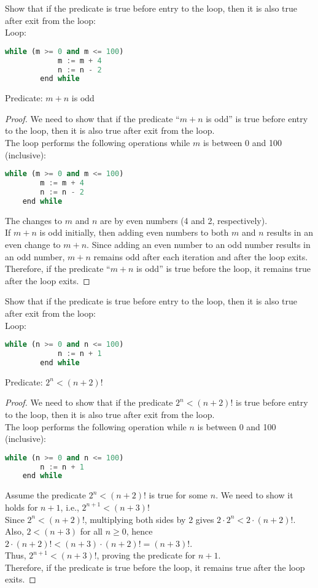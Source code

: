 \documentclass[name=Ojas\ Chaturvedi, emailid=oj.chaturvedi.2024, course=Capstone:\ Discrete\ Math, num=9, deadline={November\ 17,\ 2023}]{homework}
\begin{document}
    Show that if the predicate is true before entry to the loop, then it is also true after exit from the loop: \\
    Loop:
    \begin{lstlisting}[language=Python]
        while (m >= 0 and m <= 100)
            m := m + 4
            n := n - 2
        end while
    \end{lstlisting}
    Predicate: $m+n$ is odd
\begin{proof}
    We need to show that if the predicate ``$m + n$ is odd'' is true before entry to the loop, then it is also true after exit from the loop. \\
    The loop performs the following operations while $m$ is between 0 and 100 (inclusive):
    \begin{lstlisting}[language=Python]
    while (m >= 0 and m <= 100)
        m := m + 4
        n := n - 2
    end while
    \end{lstlisting}
    The changes to $m$ and $n$ are by even numbers (4 and 2, respectively). \\
    If $m + n$ is odd initially, then adding even numbers to both $m$ and $n$ results in an even change to $m + n$. Since adding an even number to an odd number results in an odd number, $m + n$ remains odd after each iteration and after the loop exits. \\
    Therefore, if the predicate ``$m + n$ is odd'' is true before the loop, it remains true after the loop exits.
\end{proof}

    Show that if the predicate is true before entry to the loop, then it is also true after exit from the loop: \\
    Loop:
    \begin{lstlisting}[language=Python]
        while (n >= 0 and n <= 100)
            n := n + 1
        end while
    \end{lstlisting}
    Predicate: $2^n < (n+2)! $
\begin{proof}
    We need to show that if the predicate $2^n < (n+2)!$ is true before entry to the loop, then it is also true after exit from the loop. \\
    The loop performs the following operation while $n$ is between 0 and 100 (inclusive):
    \begin{lstlisting}[language=Python]
    while (n >= 0 and n <= 100)
        n := n + 1
    end while
    \end{lstlisting}
    Assume the predicate $2^n < (n+2)!$ is true for some $n$. We need to show it holds for $n+1$, i.e., $2^{n+1} < {(n+3)} ! $ \\
    Since $2^n < (n+2)!$, multiplying both sides by 2 gives $2 \cdot 2^n < 2 \cdot (n+2)!$. Also, $2 < (n+3)$ for all $n \geq 0$, hence $2 \cdot (n+2)! < (n+3) \cdot (n+2)! = (n+3)!$. \\
    Thus, $2^{n+1} < (n+3)!$, proving the predicate for $n+1$. \\
    Therefore, if the predicate is true before the loop, it remains true after the loop exits.
\end{proof}
\end{document}
